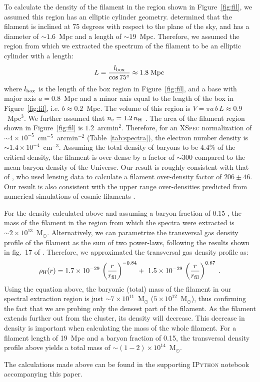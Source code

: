 To calculate the density of the filament in the region shown in Figure~\ref{fig:fil}, we assumed this region has an elliptic cylinder geometry. \citet{Jauzac2012} determined that the filament is inclined at 75 degrees with respect to the plane of the sky, and has a diameter of $\sim 1.6$~Mpc and a length of $\sim 19$~Mpc. Therefore, we assumed the region from which we extracted the spectrum of the filament to be an elliptic cylinder with a length:
\begin{equation}
	L = \frac{l_{\rm box}}{\cos{75^{\circ}}} \approx 1.8 \; {\rm Mpc}\,  \nonumber
\end{equation}
where $l_{\rm box}$ is the length of the box region in Figure~\ref{fig:fil}, and a base with major axis $a = 0.8$~Mpc and a minor axis equal to the length of the box in Figure~\ref{fig:fil}, i.e. $b \approx 0.2$~Mpc. The volume of this region is $V = \pi a\, b \, L \approx 0.9$~Mpc$^3$. We further assumed that $n_{\rm e} = 1.2 \, n_{\rm H}$ \citep{Bohringer2010}. The area of the filament region shown in Figure~\ref{fig:fil} is $1.2$~arcmin$^2$. Therefore, for an \textsc{XSpec} normalization of $\sim 4\times 10^{-5}$~cm$^{-5}$~arcmin${^{-2}}$ (Table~\ref{tab:spectra}), the electron number density is $\sim 1.4\times 10^{-4}$~cm$^{-3}$. Assuming the total density of baryons to be $4.4\%$ of the critical density\citep{Kirkman2003}, the filament is over-dense by a factor of $\sim 300$ compared to the mean baryon density of the Universe. Our result is roughly consistent with that of \citet{Jauzac2012}, who used lensing data to calculate a filament over-density factor of $206 \pm 46$. Our result is also consistent with the upper range over-densities predicted from numerical simulations of cosmic filaments \citep[e.g.,][]{Gheller2015}.

For the density calculated above and assuming a baryon fraction of 0.15 \citep{Mantz2014}, the mass of the filament in the region from which the spectra were extracted is $\sim 2\times 10^{13}$~M$_\odot$. Alternatively, we can parametrize the transversal gas density profile of the filament as the sum of two power-laws, following the results shown in fig.~17 of \citet{Gheller2015}. Therefore, we approximated the transversal gas density profile as:
\begin{equation}
	\rho_{\rm H}(r) = 1.7 \times 10^{-29} \, \left(\frac{r}{r_{\rm fil}}\right)^{-0.84} + \
	                             1.5 \times 10^{-29} \, \left(\frac{r}{r_{\rm fil}}\right)^{0.67}  \;. \nonumber
\end{equation}
Using the equation above, the baryonic (total) mass of the filament in our spectral extraction region is just $\sim 7\times 10^{11}$~M$_\odot$ ($5\times 10^{12}$~M$_\odot$), thus confirming the fact that we are probing only the densest part of the filament. As the filament extends further out from the cluster, its density will decrease. This decrease in density is important when calculating the mass of the whole filament. For a filament length of 19~Mpc and a baryon fraction of 0.15, the transversal density profile above yields a total mass of $\sim (1-2)\times 10^{14}$~M$_\odot$. 

The calculations made above can be found in the supporting \textsc{IPython} notebook accompanying this paper.  





